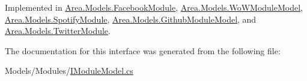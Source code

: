 Implemented in \mbox{\hyperlink{classArea_1_1Models_1_1FacebookModule_aa992d24aaa0e9ebd0a2f2c38607222d5}{Area.\+Models.\+Facebook\+Module}}, \mbox{\hyperlink{classArea_1_1Models_1_1WoWModuleModel_a04335d82b02dd3cfe3b9ae0cb47125f6}{Area.\+Models.\+Wo\+W\+Module\+Model}}, \mbox{\hyperlink{classArea_1_1Models_1_1SpotifyModule_a54a02b412af1c23ffa05f0bc9c7bd228}{Area.\+Models.\+Spotify\+Module}}, \mbox{\hyperlink{classArea_1_1Models_1_1GithubModuleModel_aeeda0ad6ec3b9ddaa5a38e9b8a2ef020}{Area.\+Models.\+Github\+Module\+Model}}, and \mbox{\hyperlink{classArea_1_1Models_1_1TwitterModule_a2dd56c4273c09ea000d0229bb9d19019}{Area.\+Models.\+Twitter\+Module}}.



The documentation for this interface was generated from the following file\+:\begin{DoxyCompactItemize}
\item 
Models/\+Modules/\mbox{\hyperlink{IModuleModel_8cs}{I\+Module\+Model.\+cs}}\end{DoxyCompactItemize}
